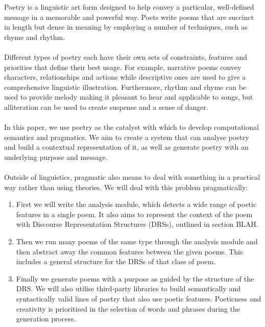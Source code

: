 Poetry is a linguistic art form designed to help convey a particular, well-defined message in a memorable and powerful way. Poets write poems that are succinct in length but dense in meaning by employing a number of techniques, such as rhyme and rhythm. 
\\\\
Different types of poetry each have their own sets of constraints, features and priorities that define their best usage. For example, narrative poems convey characters, relationships and actions while descriptive ones are used to give a comprehensive linguistic illustration. Furthermore, rhythm and rhyme can be used to provide melody making it pleasant to hear and applicable to songs, but alliteration can be used to create suspense and a sense of danger.
\\\\
In this paper, we use poetry as the catalyst with which to develop computational semantics and pragmatics. We aim to create a system that can analyse poetry and build a contextual representation of it, as well as generate poetry with an underlying purpose and message.
\\\\
Outside of linguistics, pragmatic also means to deal with something in a practical way rather than using theories. We will deal with this problem pragmatically:
\begin{enumerate}
\item{First we will write the analysis module, which detects a wide range of poetic features in a single poem. It also aims to represent the context of the poem with Discourse Representation Structures (DRSs), outlined in section BLAH.}

\item{Then we run many poems of the same type through the analysis module and then abstract away the common features between the given poems. This includes a general structure for the DRSs of that class of poem.}

\item{Finally we generate poems with a purpose as guided by the structure of the DRS. We will also utilise third-party libraries to build semantically and syntactically valid lines of poetry that also use poetic features. Poeticness and creativity is prioritised in the selection of words and phrases during the generation process.}
\end{enumerate}


